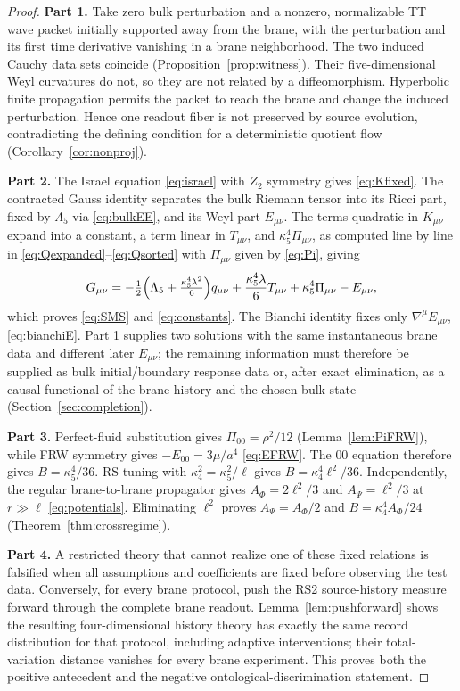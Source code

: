 \documentclass[11pt,a4paper]{article}
\theoremstyle{plain}
\theoremstyle{definition}
\newcommand{\kfive}{\kappa_5}
\newcommand{\kfour}{\kappa_4}
\newcommand{\Lfive}{\Lambda_5}
\begin{document}
\begin{proof}
\textbf{Part 1.} Take zero bulk perturbation and a nonzero, normalizable
TT wave packet initially supported away from the brane, with the
perturbation and its first time derivative vanishing in a brane
neighborhood. The two induced Cauchy data sets coincide
(Proposition~\ref{prop:witness}). Their five-dimensional Weyl curvatures
do not, so they are not related by a diffeomorphism. Hyperbolic finite
propagation permits the packet to reach the brane and change the induced
perturbation. Hence one readout fiber is not preserved by source
evolution, contradicting the defining condition for a deterministic
quotient flow (Corollary~\ref{cor:nonproj}).

\textbf{Part 2.} The Israel equation \eqref{eq:israel} with $Z_2$
symmetry gives \eqref{eq:Kfixed}. The contracted Gauss identity separates
the bulk Riemann tensor into its Ricci part, fixed by $\Lfive$ via
\eqref{eq:bulkEE}, and its Weyl part $E_{\mu\nu}$. The terms quadratic in
$K_{\mu\nu}$ expand into a constant, a term linear in $T_{\mu\nu}$, and
$\kfive^4\Pi_{\mu\nu}$, as computed line by line in
\eqref{eq:Qexpanded}--\eqref{eq:Qsorted} with $\Pi_{\mu\nu}$ given by
\eqref{eq:Pi},
giving
\begin{equation}
G_{\mu\nu}
=-\tfrac12\Bigl(\Lfive+\tfrac{\kfive^4\lambda^2}{6}\Bigr)q_{\mu\nu}
+\frac{\kfive^4\lambda}{6}T_{\mu\nu}
+\kfive^4\Pi_{\mu\nu}-E_{\mu\nu},
\end{equation}
which proves \eqref{eq:SMS} and \eqref{eq:constants}. The Bianchi
identity fixes only $\nabla^\mu E_{\mu\nu}$, \eqref{eq:bianchiE}. Part 1
supplies two solutions with the same instantaneous brane data and
different later $E_{\mu\nu}$; the remaining information must therefore be
supplied as bulk initial/boundary response data or, after exact
elimination, as a causal functional of the brane history and the chosen
bulk state (Section~\ref{sec:completion}).

\textbf{Part 3.} Perfect-fluid substitution gives $\Pi_{00}=\rho^2/12$
(Lemma~\ref{lem:PiFRW}), while FRW symmetry gives $-E_{00}=3\mu/a^4$
\eqref{eq:EFRW}. The $00$ equation therefore gives $B=\kfive^4/36$. RS
tuning with $\kfour^2=\kfive^2/\ell$ gives $B=\kfour^4\ell^2/36$.
Independently, the regular brane-to-brane propagator gives
$A_\Phi=2\ell^2/3$ and $A_\Psi=\ell^2/3$ at $r\gg\ell$
\eqref{eq:potentials}. Eliminating $\ell^2$ proves
$A_\Psi=A_\Phi/2$ and $B=\kfour^4A_\Phi/24$
(Theorem~\ref{thm:crossregime}).

\textbf{Part 4.} A restricted theory that cannot realize one of these
fixed relations is falsified when all assumptions and coefficients are
fixed before observing the test data. Conversely, for every brane
protocol, push the RS2 source-history measure forward through the
complete brane readout. Lemma~\ref{lem:pushforward} shows the resulting
four-dimensional history theory has exactly the same record distribution
for that protocol, including adaptive interventions; their total-variation
distance vanishes for every brane experiment. This proves both the
positive antecedent and the negative ontological-discrimination
statement.
\end{proof}
\end{document}
